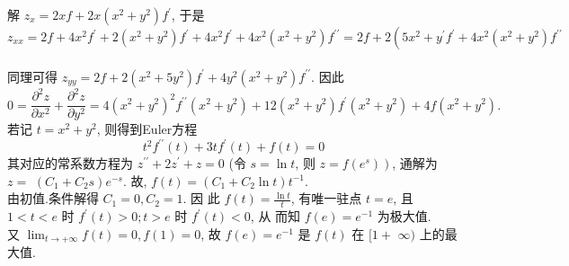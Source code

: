 \documentclass[a4paper,11pt,UTF8]{article}
\begin{document}
解 $z_x=2 x f+2 x\left(x^2+y^2\right) f^{\prime}$, 于是
$$
z_{x x}=2 f+4 x^2 f^{\prime}+2\left(x^2+y^2\right) f^{\prime}+4 x^2 f^{\prime}+4 x^2\left(x^2+y^2\right) f^{\prime \prime}=2 f+2\left(5 x^2+y^{\prime} f^{\prime}+4 x^2\left(x^2+y^2\right) f^{\prime \prime}\right.
$$\\
同理可得 $z_{y y}=2 f+2\left(x^2+5 y^2\right) f^{\prime}+4 y^2\left(x^2+y^2\right) f^{\prime \prime}$. 因此
$$
0=\frac{\partial^2 z}{\partial x^2}+\frac{\partial^2 z}{\partial y^2}=4\left(x^2+y^2\right)^2 f^{\prime \prime}\left(x^2+y^2\right)+12\left(x^2+y^2\right) f^{\prime}\left(x^2+y^2\right)+4 f\left(x^2+y^2\right) \text {. }
$$
若记 $t=x^2+y^2$, 则得到Euler方程
$$
t^2 f^{\prime \prime}(t)+3 t f^{\prime}(t)+f(t)=0
$$
其对应的常系数方程为 $z^{\prime \prime}+2 z^{\prime}+z=0$ (令 $s=\ln t$, 则 $\left.z=f\left(e^s\right)\right)$, 通解为 $z=$ $\left(C_1+C_2 s\right) e^{-s}$. 故, $f(t)=\left(C_1+C_2 \ln t\right) t^{-1}$.\\
 由初值.条件解得 $C_1=0, C_2=1$. 因 此 $f(t)=\frac{\ln t}{t}$, 有唯一驻点 $t=e$, 且 $1<t<e$ 时 $f^{\prime}(t)>0 ; t>e$ 时 $f^{\prime}(t)<0$, 从 而知 $f(e)=e^{-1}$ 为极大值.\\
  又 $\lim _{t \rightarrow+\infty} f(t)=0, f(1)=0$, 故 $f(e)=e^{-1}$ 是 $f(t)$ 在 $[1+$ $\infty)$ 上的最大值.
\end{document}
